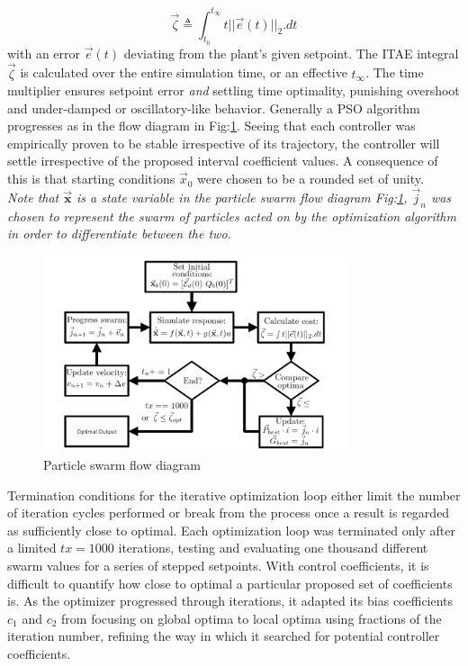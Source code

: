 \begin{equation}
\vec{\zeta}\triangleq\int_{t_0}^{t_\infty}t||\vec{e}(t)||_2.dt
\end{equation}
with an error $\vec{e}(t)$ deviating from the plant's given setpoint. The ITAE integral $\vec{\zeta}$ is calculated over the entire simulation time, or an effective $t_\infty$. The time multiplier ensures setpoint error \emph{and} settling time optimality, punishing overshoot and under-damped or oscillatory-like behavior. Generally a PSO algorithm progresses as in the flow diagram in Fig:\ref{fig:particle-diagram}. Seeing that each controller was empirically proven to be stable irrespective of its trajectory, the controller will settle irrespective of the proposed interval coefficient values. A consequence of this is that starting conditions $\vec{x}_0$ were chosen to be a rounded set of unity.
\\
\emph{\color{Gray} Note that $\vec{\mathbf{x}}$ is a state variable in the particle swarm flow diagram Fig:\ref{fig:particle-diagram}, $\vec{j}_n$ was chosen to represent the swarm of particles acted on by the optimization algorithm in order to differentiate between the two.}
\\
\begin{figure}[htbp]
\centering
\includegraphics[width=0.8\textwidth]{figs/particle-diagram}\vspace{-12pt}
\caption{Particle swarm flow diagram}
\label{fig:particle-diagram}
\vspace{-18pt}
\end{figure}
\par
Termination conditions for the iterative optimization loop either limit the number of iteration cycles performed or break from the process once a result is regarded as sufficiently close to optimal. Each optimization loop was terminated only after a limited $tx=1000$ iterations, testing and evaluating one thousand different swarm values for a series of stepped setpoints. With control coefficients, it is difficult to quantify how close to optimal a particular proposed set of coefficients is. As the optimizer progressed through iterations, it adapted its bias coefficients $c_1$ and $c_2$ from focusing on global optima to local optima using fractions of the iteration number, refining the way in which it searched for potential controller coefficients.

